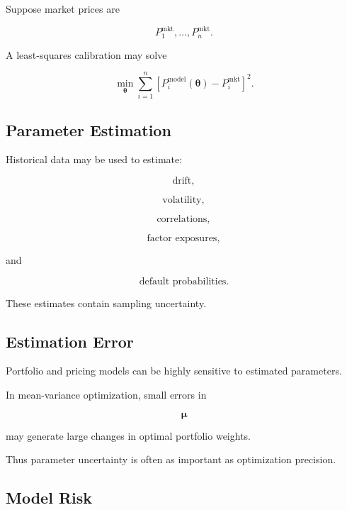 Suppose market prices are

\[
P_1^{\mathrm{mkt}},
\ldots,
P_n^{\mathrm{mkt}}.
\]

A least-squares calibration may solve

\[
\boxed{
\min_{\boldsymbol{\theta}}
\sum_{i=1}^{n}
\left[
P_i^{\mathrm{model}}(\boldsymbol{\theta})
-
P_i^{\mathrm{mkt}}
\right]^2.
}
\]

\subsection{Parameter Estimation}
\label{subsec:financial-parameter-estimation}

Historical data may be used to estimate:

\[
\boxed{
\text{drift},
}
\]

\[
\boxed{
\text{volatility},
}
\]

\[
\boxed{
\text{correlations},
}
\]

\[
\boxed{
\text{factor exposures},
}
\]

and

\[
\boxed{
\text{default probabilities}.
}
\]

These estimates contain sampling uncertainty.

\subsection{Estimation Error}
\label{subsec:financial-estimation-error}

Portfolio and pricing models can be highly sensitive to estimated parameters.

In mean-variance optimization, small errors in

\[
\boldsymbol{\mu}
\]

may generate large changes in optimal portfolio weights.

Thus parameter uncertainty is often as important as optimization precision.

\subsection{Model Risk}
\label{subsec:financial-model-risk}

